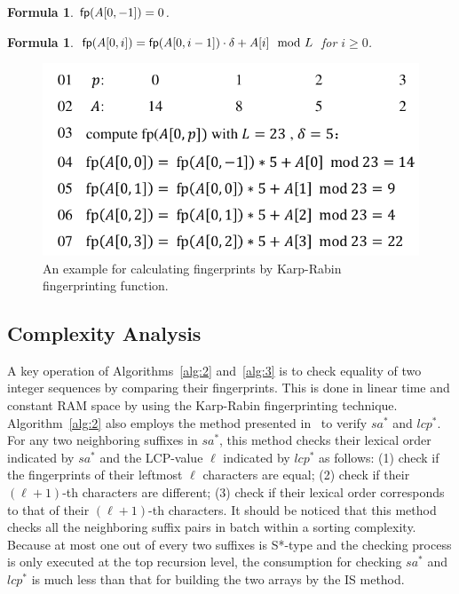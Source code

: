 \documentclass[10pt,journal,compsoc]{IEEEtran}
\newtheorem{formula}[theorem]{Formula}
\begin{document}
\begin{formula} \label{formula:1}${\sf fp}(A[0, -1]) = 0$.
\end{formula}

\begin{formula} \label{formula:2}${\sf fp}(A[0, i]) = {\sf fp}(A[0, i - 1]) \cdot {\delta} + A[i]\mod L$ for $i \ge 0$.
\end{formula}

\begin{figure}[htbp!]
	\centering
	
	\includegraphics[width = 1\columnwidth]{example2.pdf}
	
	\caption{An example for calculating fingerprints by Karp-Rabin fingerprinting function.}
	
	\label{fig:example2}
	
\end{figure}

\subsection{Complexity Analysis}

A key operation of Algorithms~\ref{alg:2} and~\ref{alg:3} is to check equality of two integer sequences by comparing their fingerprints. This is done in linear time and constant RAM space by using the Karp-Rabin fingerprinting technique. Algorithm~\ref{alg:2} also employs the method presented in~\cite{wu2017} to verify $sa^*$ and $lcp^*$. For any two neighboring suffixes in $sa^*$, this method checks their lexical order indicated by $sa^*$ and the LCP-value $\ell$ indicated by $lcp^*$ as follows: (1) check if the fingerprints of their leftmost $\ell$ characters are equal; (2) check if their $(\ell + 1)$-th characters are different; (3) check if their lexical order corresponds to that of their $(\ell + 1)$-th characters. It should be noticed that this method checks all the neighboring suffix pairs in batch within a sorting complexity. Because at most one out of every two suffixes is S*-type and the checking process is only executed at the top recursion level, the consumption for checking $sa^*$ and $lcp^*$ is much less than that for building the two arrays by the IS method. 
\end{document}
